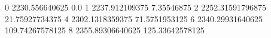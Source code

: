 0 2230.556640625 0.0
1 2237.912109375 7.35546875
2 2252.31591796875 21.75927734375
4 2302.1318359375 71.5751953125
6 2340.29931640625 109.74267578125
8 2355.89306640625 125.33642578125
